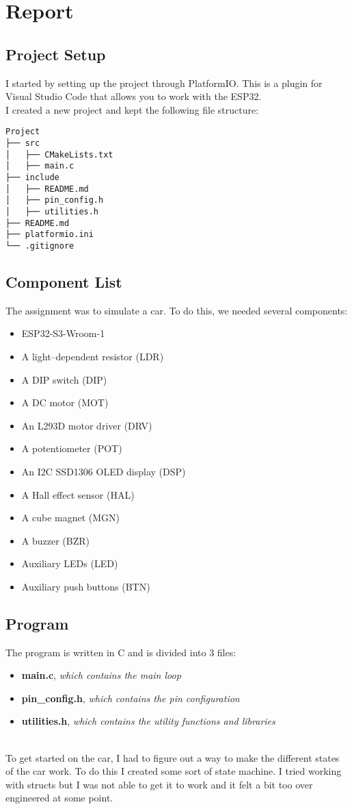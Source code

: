\section{Report}
\label{sec:report}

\subsection{Project Setup}
I started by setting up the project through PlatformIO. This is a plugin for Visual Studio Code that allows you to work with the ESP32. \\
I created a new project and kept the following file structure:
\begin{verbatim}
Project
├── src
│   ├── CMakeLists.txt
│   ├── main.c
├── include
│   ├── README.md
│   ├── pin_config.h
│   ├── utilities.h
├── README.md
├── platformio.ini
└── .gitignore
\end{verbatim}

\subsection{Component List}
The assignment was to simulate a car. To do this, we needed several components:
\begin{itemize}
    \item ESP32-S3-Wroom-1
    \item A light–dependent resistor (LDR)
    \item A DIP switch (DIP)
    \item A DC motor (MOT)
    \item An L293D motor driver (DRV)
    \item A potentiometer (POT)
    \item An I2C SSD1306 OLED display (DSP)
    \item A Hall effect sensor (HAL)
    \item A cube magnet (MGN)
    \item A buzzer (BZR)
    \item Auxiliary LEDs (LED)
    \item Auxiliary push buttons (BTN)
\end{itemize}

\subsection{Program}
The program is written in C and is divided into 3 files:
\begin{itemize}
    \item {\textbf{main.c}}, \textit{which contains the main loop}
    \item {\textbf{pin\_config.h}}, \textit{which contains the pin configuration}
    \item {\textbf{utilities.h}}, \textit{which contains the utility functions and libraries}
\end{itemize} 
\\
To get started on the car, I had to figure out a way to make the different states of the car work. To do this I created some sort of state machine. I tried working with structs but I was not able to get it to work and it felt a bit too over engineered at some point.

